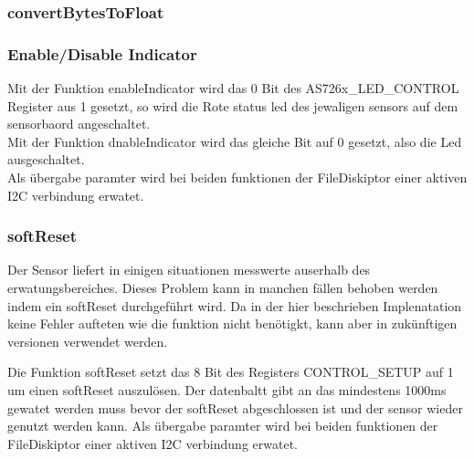 \subsubsection{convertBytesToFloat}
\subsubsection{Enable/Disable Indicator}
Mit der Funktion enableIndicator wird das 0 Bit des AS726x\_LED\_CONTROL Register aus 1 gesetzt, so wird die Rote status led des jewaligen sensors auf dem sensorbaord angeschaltet.\\
Mit der Funktion dnableIndicator wird das gleiche Bit auf 0 gesetzt, also die Led ausgeschaltet.\\
Als übergabe paramter wird bei beiden funktionen der FileDiskiptor einer aktiven I2C verbindung erwatet.\\

\subsubsection{softReset}
Der Sensor liefert in einigen situationen messwerte auserhalb des erwatungsbereiches.
Dieses Problem kann in manchen fällen behoben werden indem ein softReset durchgeführt wird.
Da in der hier beschrieben Implenatation keine Fehler aufteten wie die funktion nicht benötigkt, kann aber in zukünftigen versionen verwendet werden.

Die Funktion softReset setzt das 8 Bit des Registers CONTROL\_SETUP auf 1 um einen softReset auszulösen.
Der datenbaltt gibt an das mindestens 1000ms gewatet werden muss bevor der softReset abgeschlossen ist und der sensor wieder genutzt werden kann.
Als übergabe paramter wird bei beiden funktionen der FileDiskiptor einer aktiven I2C verbindung erwatet.
